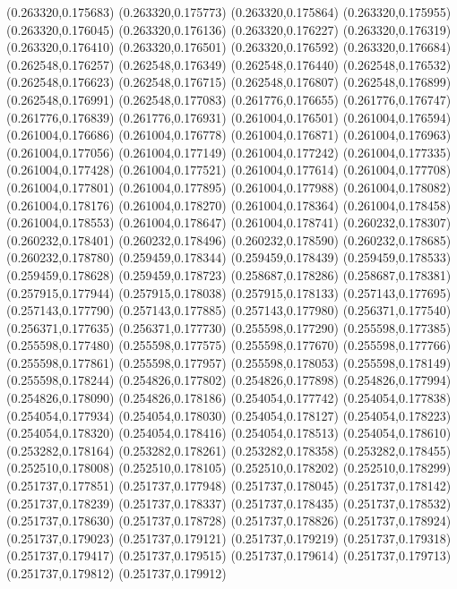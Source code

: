 (0.263320,0.175683)
(0.263320,0.175773)
(0.263320,0.175864)
(0.263320,0.175955)
(0.263320,0.176045)
(0.263320,0.176136)
(0.263320,0.176227)
(0.263320,0.176319)
(0.263320,0.176410)
(0.263320,0.176501)
(0.263320,0.176592)
(0.263320,0.176684)
(0.262548,0.176257)
(0.262548,0.176349)
(0.262548,0.176440)
(0.262548,0.176532)
(0.262548,0.176623)
(0.262548,0.176715)
(0.262548,0.176807)
(0.262548,0.176899)
(0.262548,0.176991)
(0.262548,0.177083)
(0.261776,0.176655)
(0.261776,0.176747)
(0.261776,0.176839)
(0.261776,0.176931)
(0.261004,0.176501)
(0.261004,0.176594)
(0.261004,0.176686)
(0.261004,0.176778)
(0.261004,0.176871)
(0.261004,0.176963)
(0.261004,0.177056)
(0.261004,0.177149)
(0.261004,0.177242)
(0.261004,0.177335)
(0.261004,0.177428)
(0.261004,0.177521)
(0.261004,0.177614)
(0.261004,0.177708)
(0.261004,0.177801)
(0.261004,0.177895)
(0.261004,0.177988)
(0.261004,0.178082)
(0.261004,0.178176)
(0.261004,0.178270)
(0.261004,0.178364)
(0.261004,0.178458)
(0.261004,0.178553)
(0.261004,0.178647)
(0.261004,0.178741)
(0.260232,0.178307)
(0.260232,0.178401)
(0.260232,0.178496)
(0.260232,0.178590)
(0.260232,0.178685)
(0.260232,0.178780)
(0.259459,0.178344)
(0.259459,0.178439)
(0.259459,0.178533)
(0.259459,0.178628)
(0.259459,0.178723)
(0.258687,0.178286)
(0.258687,0.178381)
(0.257915,0.177944)
(0.257915,0.178038)
(0.257915,0.178133)
(0.257143,0.177695)
(0.257143,0.177790)
(0.257143,0.177885)
(0.257143,0.177980)
(0.256371,0.177540)
(0.256371,0.177635)
(0.256371,0.177730)
(0.255598,0.177290)
(0.255598,0.177385)
(0.255598,0.177480)
(0.255598,0.177575)
(0.255598,0.177670)
(0.255598,0.177766)
(0.255598,0.177861)
(0.255598,0.177957)
(0.255598,0.178053)
(0.255598,0.178149)
(0.255598,0.178244)
(0.254826,0.177802)
(0.254826,0.177898)
(0.254826,0.177994)
(0.254826,0.178090)
(0.254826,0.178186)
(0.254054,0.177742)
(0.254054,0.177838)
(0.254054,0.177934)
(0.254054,0.178030)
(0.254054,0.178127)
(0.254054,0.178223)
(0.254054,0.178320)
(0.254054,0.178416)
(0.254054,0.178513)
(0.254054,0.178610)
(0.253282,0.178164)
(0.253282,0.178261)
(0.253282,0.178358)
(0.253282,0.178455)
(0.252510,0.178008)
(0.252510,0.178105)
(0.252510,0.178202)
(0.252510,0.178299)
(0.251737,0.177851)
(0.251737,0.177948)
(0.251737,0.178045)
(0.251737,0.178142)
(0.251737,0.178239)
(0.251737,0.178337)
(0.251737,0.178435)
(0.251737,0.178532)
(0.251737,0.178630)
(0.251737,0.178728)
(0.251737,0.178826)
(0.251737,0.178924)
(0.251737,0.179023)
(0.251737,0.179121)
(0.251737,0.179219)
(0.251737,0.179318)
(0.251737,0.179417)
(0.251737,0.179515)
(0.251737,0.179614)
(0.251737,0.179713)
(0.251737,0.179812)
(0.251737,0.179912)
